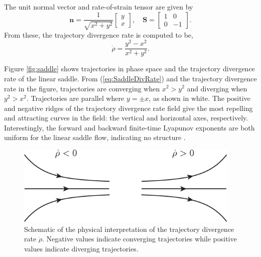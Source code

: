 \documentclass[twocolumn]{svjour3}
\newcommand{\edit}[3]{{\color{red} #2}}
\begin{document}
The unit normal vector and rate-of-strain tensor are given by 
\begin{equation}
\mathbf{n} = \frac{1}{\sqrt{x^2+y^2}}\left[\begin{array}{c}
y \\
x
\end{array}\right], \quad
\mathbf{S} = \left[\begin{array}{cc}
1 & 0 \\
0 & -1
\end{array}\right].
\end{equation}
From these, the trajectory divergence rate is computed to be,
\begin{equation}
\dot{\rho} = \frac{y^2-x^2}{x^2+y^2}.
\label{eq:SaddleDivRate}
\end{equation}

Figure \ref{fig:saddle} shows trajectories in phase space and the trajectory divergence rate of the linear saddle. From (\ref{eq:SaddleDivRate}) and the trajectory divergence rate in the figure, trajectories are converging when $x^2>y^2$ and diverging when $y^2>x^2$. Trajectories are parallel where $y=\pm x$, as shown in white. The positive and negative ridges of the trajectory divergence rate field give the most repelling and attracting curves in the field: the vertical and horizontal axes, respectively. Interestingly, the forward and backward finite-time Lyapunov exponents are both uniform for the linear saddle flow, indicating no structure \cite{haller_variational_2011}.

\begin{figure}
\centering
\includegraphics[height=1.5in]{Fig5}
\caption{Schematic of the physical interpretation of the trajectory divergence rate $\dot{\rho}$. Negative values indicate converging trajectories while positive values indicate diverging trajectories.}
\label{fig:DivRateSchema}
\end{figure}

\edit{A similar quantity has been applied to the normal direction of a candidate Lagrangian coherent structure as a test of hyperbolicity, using gradients of the finite-time Lyapunov exponent field to determine the tangent and normal directions \cite{green2010using}. The trajectory divergence rate, in contrast, uses the vector normal to trajectories of the dynamical system. From this observation, it is clear that the trajectory divergence rate gives the normal hyperbolicity field of the vector field.}{}{16}
\end{document}

